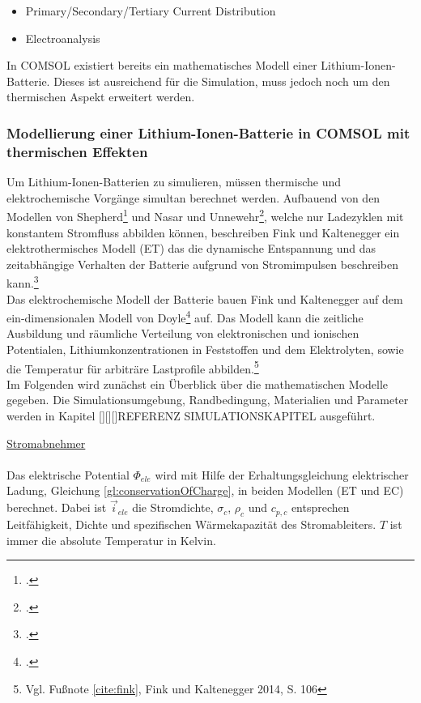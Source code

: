 \begin{itemize}
	\item Primary/Secondary/Tertiary Current Distribution
	\item Electroanalysis
\end{itemize}

In COMSOL\textsuperscript{\textregistered} existiert bereits ein mathematisches Modell einer Lithium-Ionen-Batterie. Dieses ist ausreichend für die Simulation, muss jedoch noch um den thermischen Aspekt erweitert werden.\\

\subsubsection*{Modellierung einer Lithium-Ionen-Batterie in COMSOL\textsuperscript{\textregistered} mit thermischen Effekten}\label{subsub:modellthermalLIB}

Um Lithium-Ionen-Batterien zu simulieren, müssen thermische und elektrochemische Vorgänge simultan berechnet werden. Aufbauend von den Modellen von Shepherd\footcite[Vgl.][]{Shepherd.1965} und Nasar und Unnewehr\footcite[Vgl.][]{Nasar.1982}, welche nur Ladezyklen mit konstantem Stromfluss abbilden können, beschreiben Fink und Kaltenegger ein elektrothermisches Modell (ET) das die dynamische Entspannung und das zeitabhängige Verhalten der Batterie aufgrund von Stromimpulsen beschreiben kann.\footcite[Vgl.\label{cite:fink}][S. 105-124]{Fink.2014} \\
Das elektrochemische Modell der Batterie bauen Fink und Kaltenegger auf dem ein-dimensionalen Modell von Doyle\footcite[Vgl.][S. 1890-1903]{Doyle.1996} auf. Das Modell kann die zeitliche Ausbildung und räumliche Verteilung von elektronischen und ionischen Potentialen, Lithiumkonzentrationen in Feststoffen und dem Elektrolyten, sowie die Temperatur für arbiträre Lastprofile abbilden.\footnote{Vgl. Fußnote \ref{cite:fink}, Fink und Kaltenegger 2014, S. 106}\\
Im Folgenden wird zunächst ein Überblick über die mathematischen Modelle gegeben. Die Simulationsumgebung, Randbedingung, Materialien und Parameter werden in Kapitel [][][]REFERENZ SIMULATIONSKAPITEL %
ausgeführt.\newline

\underline{Stromabnehmer}\\
\\
Das elektrische Potential $\Phi_{ele}$ wird mit Hilfe der Erhaltungsgleichung elektrischer Ladung, Gleichung \ref{gl:conservationOfCharge}, in beiden Modellen (ET und EC) berechnet. Dabei ist $\vec{i}_{ele}$ die Stromdichte, $\sigma_{c}$, $\rho_{c}$ und $c_{p,c}$ entsprechen Leitfähigkeit, Dichte und spezifischen Wärmekapazität des Stromableiters. $T$ ist immer die absolute Temperatur in Kelvin.

